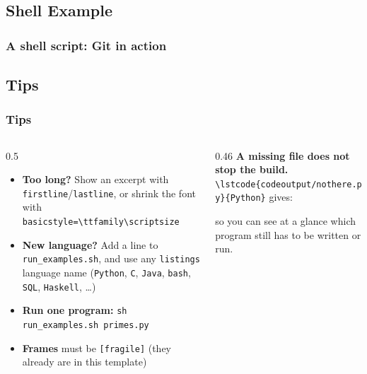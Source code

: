 \documentclass[aspectratio=169,10pt,compress]{beamer}
\newcommand{\cmd}[1]{\texttt{\color{gitred}#1}}
\begin{document}
\subsection[Shell]{Shell Example}

\begin{frame}[t,fragile] \frametitle{A shell script: Git in action}
\end{frame}








\subsection[Tips]{Tips}

\begin{frame}[t,fragile] \frametitle{Tips}
  \begin{columns}[T]
    \begin{column}{0.5\textwidth}
      \begin{itemize}\small
        \item \textbf{Too long?} Show an excerpt with \texttt{firstline}/\texttt{lastline},
              or shrink the font with \texttt{basicstyle=\textbackslash ttfamily\textbackslash scriptsize}
        \item \textbf{New language?} Add a line to \texttt{run\_examples.sh}, and use any
              \texttt{listings} language name (\texttt{Python}, \texttt{C}, \texttt{Java},
              \texttt{bash}, \texttt{SQL}, \texttt{Haskell}, \dots)
        \item \textbf{Run one program:} \cmd{sh run\_examples.sh primes.py}
        \item \textbf{Frames} must be \texttt{[fragile]} (they already are in this template)
      \end{itemize}
    \end{column}
    \begin{column}{0.46\textwidth}
      \small \textbf{A missing file does not stop the build.}
      \verb|\lstcode{codeoutput/nothere.py}{Python}| gives:
      \vspace{0.3em}


      \small so you can see at a glance which program still has to be written or run.
    \end{column}
  \end{columns}
\end{frame}
\end{document}
